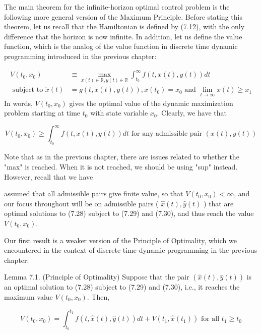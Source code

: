 \documentclass[\topdir/lecture_notes.tex]{subfiles}
\begin{document}
The main theorem for the infinite-horizon optimal control problem is the following more general version of the Maximum Principle. Before stating this theorem, let us recall that the Hamiltonian is defined by (7.12), with the only difference that the horizon is now infinite. In addition, let us define the value function, which is the analog of the value function in discrete time dynamic programming introduced in the previous chapter:

\[
\begin{aligned}
V\left(t_{0}, x_{0}\right) & \equiv \max _{x(t) \in \mathbb{R}, y(t) \in \mathbb{R}} \int_{t_{0}}^{\infty} f(t, x(t), y(t)) d t \\
\text { subject to } \dot{x}(t) & =g(t, x(t), y(t)), x\left(t_{0}\right)=x_{0} \text { and } \lim _{t \rightarrow \infty} x(t) \geq x_{1}
\end{aligned}
\]
In words, $V\left(t_{0}, x_{0}\right)$ gives the optimal value of the dynamic maximization problem starting at time $t_{0}$ with state variable $x_{0}$. Clearly, we have that

\[
V\left(t_{0}, x_{0}\right) \geq \int_{t_{0}}^{\infty} f(t, x(t), y(t)) d t \text { for any admissible pair }(x(t), y(t))
\]

Note that as in the previous chapter, there are issues related to whether the "max" is reached. When it is not reached, we should be using "sup" instead. However, recall that we have

assumed that all admissible pairs give finite value, so that $V\left(t_{0}, x_{0}\right)<\infty$, and our focus throughout will be on admissible pairs ( $\hat{x}(t), \hat{y}(t)$ ) that are optimal solutions to (7.28) subject to (7.29) and (7.30), and thus reach the value $V\left(t_{0}, x_{0}\right)$.

Our first result is a weaker version of the Principle of Optimality, which we encountered in the context of discrete time dynamic programming in the previous chapter:

Lemma 7.1. (Principle of Optimality) Suppose that the pair $(\hat{x}(t), \hat{y}(t))$ is an optimal solution to (7.28) subject to (7.29) and (7.30), i.e., it reaches the maximum value $V\left(t_{0}, x_{0}\right)$. Then,

\[
V\left(t_{0}, x_{0}\right)=\int_{t_{0}}^{t_{1}} f(t, \hat{x}(t), \hat{y}(t)) d t+V\left(t_{1}, \hat{x}\left(t_{1}\right)\right) \text { for all } t_{1} \geq t_{0}
\]
\end{document}
